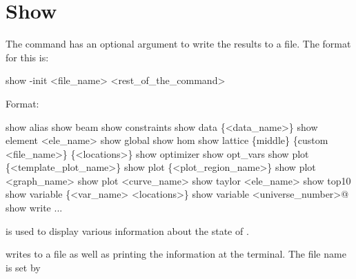 {%
\section{Show}
\label{s:show}

The  command has an optional argument to write the results to a file.
The format for this is:
\begin{example}
  show -init <file_name> <rest_of_the_command>
\end{example}

Format:
\begin{example}
  show alias 
  show beam                    
  show constraints
  show data \{<data_name>\} 
  show element <ele_name>
  show global
  show hom
  show lattice \{middle\} \{custom <file_name>\} \{<locations>\}
  show optimizer
  show opt_vars
  show plot \{<template_plot_name>\}
  show plot \{<plot_region_name>\}
  show plot <graph_name>
  show plot <curve_name>
  show taylor <ele_name>
  show top10
  show variable \{<var_name> <locations>\}
  show variable <universe_number>@
  show write ...
\end{example}

\vskip 0.2in  is used to display various information about
the state of \tao. 

 writes to a file as well as
printing the information at the terminal. The file name is set by
\vn{global%
\vn{tao_show.dat}. Results are appended to the output file when
\vn{show write} is used multiple times. If separate files are desired
then if \vn{global%
digit number is substituted for the \vn{*}. The value of the number
starts at \vn{001} and increases by 1 each time \vn{show write} is
used.

\begin{description}
  \item[show alias]
Shows a list of defined aliases. See the \vn{alias} command for more
details.

  \item[show beam]
Shows parameters used with beam tracking including the number of particles in a bunch, etc.

  \item[show constraints]
Lists data and variable constraints.

  \item[show data]
Shows data information. If \vn{<data_name>} and \vn{<locations>} are not
present shown is a list of d2\_data names.


\end{description}}}}

